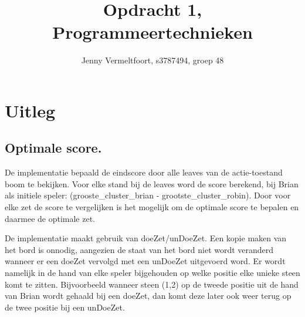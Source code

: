 \documentclass[10pt]{article}
\title{Opdracht 1, Programmeertechnieken}
\author{Jenny Vermeltfoort, s3787494, groep 48}
\begin{document}
\def\tablename{Tabel}

\maketitle

\section{Uitleg}

\subsection{Optimale score.}
De implementatie bepaald de eindscore door alle leaves van de actie-toestand boom te bekijken.
Voor elke stand bij de leaves word de score berekend, bij Brian als initiele speler: (grooste\_cluster\_brian - grootste\_cluster\_robin).
Door voor elke zet de score te vergelijken is het mogelijk om de optimale score te bepalen en daarmee de optimale zet.

De implementatie maakt gebruik van doeZet/unDoeZet. 
Een kopie maken van het bord is onnodig, aangezien de staat van het bord niet wordt veranderd wanneer er een doeZet vervolgd met een unDoeZet uitgevoerd word. 
Er wordt namelijk in de hand van elke speler bijgehouden op welke positie elke unieke steen komt te zitten. Bijvoorbeeld wanneer steen (1,2) op de tweede positie uit de hand van Brian wordt gehaald bij een doeZet, dan komt deze later ook weer terug op de twee positie bij een unDoeZet.
\end{document}
